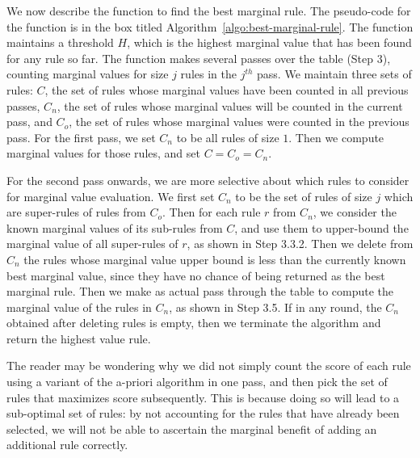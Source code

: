 \documentclass[10pt,journal,compsoc]{IEEEtran}
\newcommand{\papertext}[1]{}
\newcommand{\techreporttext}[1]{#1}
\begin{document}
We now describe the function to find the best marginal rule. \papertext{The pesudo-code for the function is in the technical report}\techreporttext{The pseudo-code for the function is in the box titled Algorithm~\ref{algo:best-marginal-rule}}. The function maintains a threshold $H$, which is the highest marginal value that has been found for any rule so far. The function makes several passes over the table \techreporttext{(Step $3$)}, counting marginal values for size $j$ rules in the $j^{th}$ pass. We maintain three sets of rules: $C$, the set of rules whose marginal values have been counted in all previous passes, $C_n$, the set of rules whose marginal values will be counted in the current pass, and $C_o$, the set of rules whose marginal values were counted in the previous pass. For the first pass, we set $C_n$ to be all rules of size $1$. Then we compute marginal values for those rules, and set $C = C_o = C_n$.

For the second pass onwards, we are more selective about which rules to consider for marginal value evaluation. We first set $C_n$ to be the set of rules of size $j$ which are super-rules of rules from $C_o$. Then for each rule $r$ from $C_n$, we consider the known marginal values of its sub-rules from $C$, and use them to upper-bound the marginal value of all super-rules of $r$, as shown in Step 3.3.2. Then we delete from $C_n$ the rules whose marginal value upper bound is less than the currently known best marginal value, since they have no chance of being returned as the best marginal rule. Then we make as actual pass through the table to compute the marginal value of the rules in $C_n$, as shown in Step 3.5. If in any round, the $C_n$ obtained after deleting rules is empty, then we terminate the algorithm and return the highest value rule. 

The reader may be wondering why we did not simply count the score of each rule using a variant of the a-priori algorithm in one pass, and then pick the set of rules that maximizes score subsequently. This is because doing so will lead to a sub-optimal set of rules: by not accounting for the rules that have already been selected, we will not be able to ascertain the marginal benefit of adding an additional rule correctly.
\end{document}
